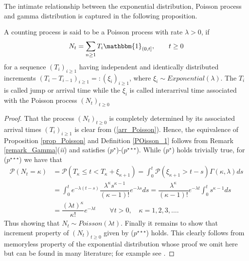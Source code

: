 The intimate relationship between the exponential distribution, Poisson process and gamma distribution is captured in the following proposition.
\begin{proposition}\label{prop_Poisson}
A counting process is said to be a Poisson process with rate $\lambda > 0$, if 
\begin{equation}\label{arr_Poisson}
    N_t = \sum_{n \geq 1} T_i\mathbbm{1}_{(0, t]}, \qquad t \geq 0
\end{equation}
for a sequence $(T_i)_{i \geq 1}$ having independent and identically distributed increments $(T_i - T_{i-1})_{i \geq 1} =: (\xi_i)_{i \geq 1}$, where $\xi_i \sim Exponential(\lambda)$. The $T_i$ is called jump or arrival time while the $\xi_i$ is called interarrival time associated with the Poisson process $(N_t)_{t \geq 0}$
\end{proposition}
\begin{proof}
That the process $(N_t)_{t \geq 0}$ is completely determined by its associated arrival times $(T_i)_{i \geq 1}$ is clear from (\ref{arr_Poisson}). Hence, the equivalence of Proposition \ref{prop_Poisson} and Definition \ref{POisson_1} follows from Remark \ref{remark_Gamma}(\textit{ii}) and satisfies ($p^{\star}$)-($p^{\star \star \star}$). While ($p^{\star}$) holds trivially true, for ($p^{\star \star \star}$) we have that 
\begin{align*}
\mathcal{P}(N_t = \kappa) &= \mathcal{P}(T_{\kappa} \leq t < T_{\kappa} + \xi_{\kappa + 1} )= \int_0^t \mathcal{P}(\xi_{\kappa + 1}> t-s) \Gamma(\kappa,\lambda) ds\\
&= \int_0^t e^{-\lambda (t-s)}\dfrac{\lambda^{\kappa} s^{\kappa-1} }{ (\kappa-1)!}e^{-\lambda s} ds = \dfrac{\lambda^{\kappa} }{ (\kappa-1)!}e^{-\lambda t} \int_0^t  s^{\kappa-1} ds\\
&= \dfrac{(\lambda t)^{\kappa} }{\kappa!}e^{-\lambda t} \qquad \forall t>0, \quad \kappa = 1, 2, 3, \ldots .
\end{align*}
Thus showing that $ N_t \sim Poisson(\lambda t)$. Finally it remains to show that increment property of  $(N_t)_{t \geq 0}$ given by ($p^{\star \star \star}$) holds. This clearly follows from memoryless property of the exponential distribution whose proof we omit here but can be found in many literature; for example see .  
\end{proof}
